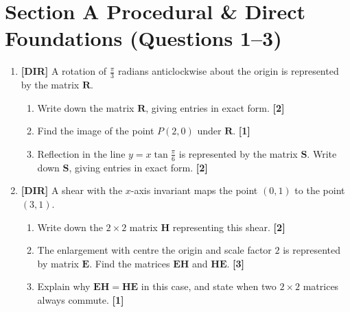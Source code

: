 \documentclass[11pt,a4paper]{article}
\begin{document}
\thispagestyle{plain}


\section*{Section A \quad Procedural \& Direct Foundations \hfill{\normalfont\footnotesize(Questions 1--3)}}
\begin{enumerate}
\item \textbf{[DIR]} A rotation of $\frac{\pi}{3}$ radians anticlockwise about the origin is represented by the matrix $\mathbf{R}$.
\begin{enumerate}
  \item Write down the matrix $\mathbf{R}$, giving entries in exact form. \hfill{\small\textbf{[2]}}
  \item Find the image of the point $P(2, 0)$ under $\mathbf{R}$. \hfill{\small\textbf{[1]}}
  \item Reflection in the line $y = x\tan\frac{\pi}{6}$ is represented by the matrix $\mathbf{S}$. Write down $\mathbf{S}$, giving entries in exact form. \hfill{\small\textbf{[2]}}
\end{enumerate}

\item \textbf{[DIR]} A shear with the $x$-axis invariant maps the point $(0, 1)$ to the point $(3, 1)$.
\begin{enumerate}
  \item Write down the $2 \times 2$ matrix $\mathbf{H}$ representing this shear. \hfill{\small\textbf{[2]}}
  \item The enlargement with centre the origin and scale factor $2$ is represented by matrix $\mathbf{E}$. Find the matrices $\mathbf{E}\mathbf{H}$ and $\mathbf{H}\mathbf{E}$. \hfill{\small\textbf{[3]}}
  \item Explain why $\mathbf{E}\mathbf{H} = \mathbf{H}\mathbf{E}$ in this case, and state when two $2 \times 2$ matrices always commute. \hfill{\small\textbf{[1]}}
\end{enumerate}


\end{enumerate}
\end{document}
